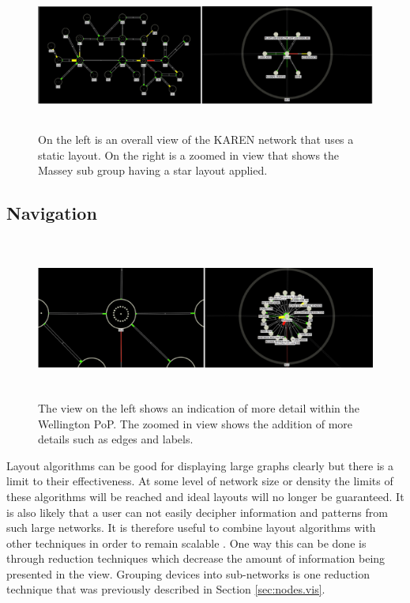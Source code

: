 \documentclass[11pt, a4paper]{article}
\begin{document}
\begin{figure}
\centering
\includegraphics[width=170mm,height=49.34mm]{assets/layouts1-1.eps}
\caption{On the left is an overall view of the KAREN network that uses a static
layout. On the right is a zoomed in view that shows the Massey sub group having 
a star layout applied.}
\label{fig:layouts1.1}
\end{figure}


\subsection{Navigation}
\label{sec:navigation.vis}

\begin{figure}[h]
\centering
\includegraphics[width=170mm,height=53mm]{assets/nav1-0.eps}
\caption{The view on the left shows an indication of more detail within the
Wellington PoP. The zoomed in view shows the addition of more details such 
as edges and labels.}
\label{fig:nav1.0}
\end{figure}

Layout algorithms can be good for displaying large graphs clearly but there is a
limit to their effectiveness. At some level of network size or density the
limits of these algorithms will be reached and ideal layouts will no longer be
guaranteed. It is also likely that a user can not easily decipher information
and patterns from such large networks. It is therefore useful to combine layout
algorithms with other techniques in order to remain scalable \cite{Herman_2000}.
One way this can be done is through reduction techniques which decrease the
amount of information being presented in the view. Grouping devices into
sub-networks is one reduction technique that was previously described in Section
\ref{sec:nodes.vis}. 
\end{document}
